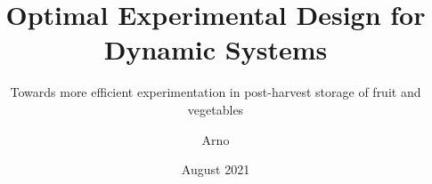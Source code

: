 \documentclass[tothejury,faculty=fbiw,department=bsy,doctoralschool=ads]{adsphd}
\title{Optimal Experimental Design for Dynamic Systems}
\subtitle{Towards more efficient experimentation in post-harvest storage of fruit and vegetables}
\author{Arno}{Strouwen}
\date{August 2021}
\begin{document}
\makefrontcoverXII
\maketitle
\frontmatter %




\tableofcontents
\listoffigures
\listoftables
\mainmatter %






\appendix


\backmatter

\printbibliography

\makebackcoverXII
\end{document}
